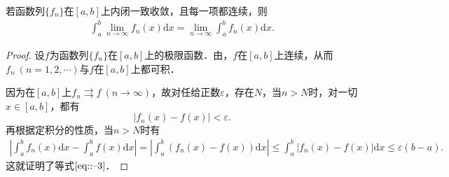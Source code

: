 \documentclass[../../main.tex]{subfiles}%
\begin{document}
\begin{theorem}[可积性]\label{theorem:函数项级数的逐项可积性}
若函数列\(\{f_n\}\)在\([a, b]\)上内闭一致收敛，且每一项都连续，则
\begin{align}
\int_a^b \lim_{n \to \infty} f_n(x) \mathrm{d}x = \lim_{n \to \infty} \int_a^b f_n(x) \mathrm{d}x. \label{eq::--3}
\end{align}
\end{theorem}
\begin{proof}
设\(f\)为函数列\(\{f_n\}\)在\([a, b]\)上的极限函数．由，\(f\)在\([a, b]\)上连续，从而\(f_n \ (n = 1, 2, \cdots)\)与\(f\)在\([a, b]\)上都可积．

因为在\([a, b]\)上\(f_n \rightrightarrows f \ (n \to \infty)\)，故对任给正数\(\varepsilon\)，存在\(N\)，当\(n > N\)时，对一切\(x \in [a, b]\)，都有
\[
|f_n(x) - f(x)| < \varepsilon.
\]
再根据定积分的性质，当\(n > N\)时有
\begin{align*}
\left| \int_a^b f_n(x) \mathrm{d}x - \int_a^b f(x) \mathrm{d}x \right| = \left| \int_a^b (f_n(x) - f(x)) \mathrm{d}x \right| 
\leqslant \int_a^b |f_n(x) - f(x)| \mathrm{d}x 
\leqslant \varepsilon(b - a).
\end{align*}
这就证明了等式\(\eqref{eq::--3}\)．\end{proof}
\end{document}
